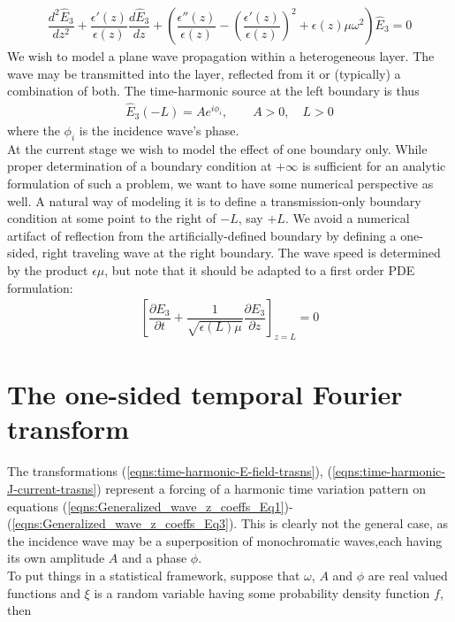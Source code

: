 \documentclass[12pt,twoside]{report}
\begin{document}
\begin{align}
\label{eqns:1-D-time-harmonic-E3_z}
\dfrac{d^2 \hat{E}_3}{d z^2} + \dfrac{\epsilon'(z)}{\epsilon(z)}\dfrac{d \hat{E}_3}{d z} + \left( \dfrac{\epsilon''(z)}{\epsilon(z)}-\left( \dfrac{\epsilon'(z)}{\epsilon(z)}\right)^2 + \epsilon(z) \mu \omega^2\right)\hat{E}_3 = 0
\end{align}
We wish to model a plane wave propagation within a heterogeneous layer. The wave may be transmitted into the layer, reflected from it or (typically) a combination of both. The time-harmonic source at the left boundary is thus
\begin{align}
\hat{E}_3(-L) = A e^{i \phi_i}, \qquad A>0, \quad L>0 
\label{eqns:1-D-time-harmonic-z-boundary-source}
\end{align}
where the $\phi_i$ is the incidence wave's phase.\\
At the current stage we wish to model the effect of one boundary only. While proper determination of a boundary condition at $+\infty$ is sufficient for an analytic formulation of such a problem, we want to have some numerical perspective as well. A natural way of modeling it is to define a transmission-only boundary condition at some point to the right of $-L$, say $+L$. We avoid a numerical artifact of reflection from the artificially-defined boundary  by defining a one-sided, right traveling wave at the right boundary. The wave speed is determined by the product $\epsilon \mu$, but note that it should be adapted to a first order PDE formulation:
\begin{align}
\label{eqns:1_D-temporal-traveling-wave-bc}
\left[\dfrac{\partial E_3}{\partial t} +  \dfrac{1}{\sqrt{\epsilon(L)\mu}}\dfrac{\partial E_3}{\partial z} \right ]_{z=L} = 0
\end{align}

\section{The one-sided temporal Fourier transform}
The transformations (\ref{eqns:time-harmonic-E-field-trasns}), (\ref{eqns:time-harmonic-J-current-trasns}) represent a forcing of a harmonic time variation pattern on equations (\ref{eqns:Generalized_wave_z_coeffs_Eq1})-(\ref{eqns:Generalized_wave_z_coeffs_Eq3}). This is clearly not the general case, as the incidence wave may be a superposition of monochromatic waves,each having its own amplitude $A$ and a phase $\phi$. \\
To put things in a statistical framework, suppose that $\omega$, $A$ and $\phi$ are real valued functions and $\xi$ is a random variable having some probability density function $f$, then 
\end{document}
